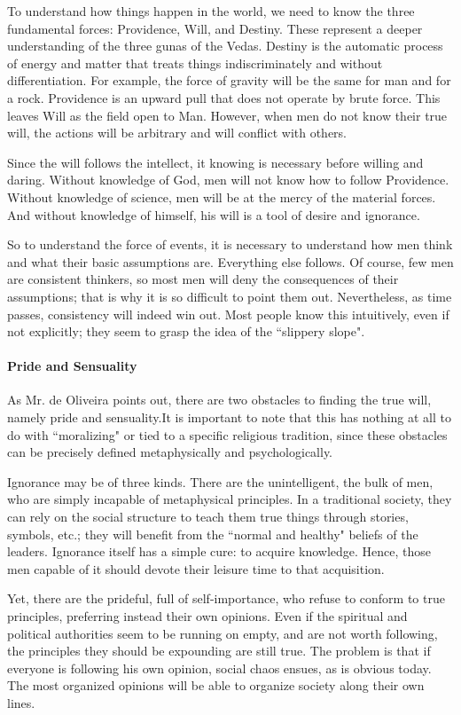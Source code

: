 To understand how things happen in the world, we need to know the three fundamental forces: Providence, Will, and
Destiny. These represent a deeper understanding of the three gunas of the Vedas. Destiny is the automatic process of
energy and matter that treats things indiscriminately and without differentiation. For example, the force of gravity
will be the same for man and for a rock. Providence is an upward pull that does not operate by brute force. This leaves
Will as the field open to Man. However, when men do not know their true will, the actions will be arbitrary and will
conflict with others.

Since the will follows the intellect, it knowing is necessary before willing and daring. Without knowledge of God, men
will not know how to follow Providence. Without knowledge of science, men will be at the mercy of the material forces.
And without knowledge of himself, his will is a tool of desire and ignorance.

So to understand the force of events, it is necessary to understand how men think and what their basic assumptions are.
Everything else follows. Of course, few men are consistent thinkers, so most men will deny the consequences of their
assumptions; that is why it is so difficult to point them out. Nevertheless, as time passes, consistency will indeed
win out. Most people know this intuitively, even if not explicitly; they seem to grasp the idea of the ``slippery
slope".

\paragraph{Pride and Sensuality}
As Mr. de Oliveira points out, there are two obstacles to finding the true will, namely pride and sensuality.It is
important to note that this has nothing at all to do with ``moralizing" or tied to a specific religious tradition, since
these obstacles can be precisely defined metaphysically and psychologically.

Ignorance may be of three kinds. There are the unintelligent, the bulk of men, who are simply incapable of metaphysical
principles. In a traditional society, they can rely on the social structure to teach them true things through stories,
symbols, etc.; they will benefit from the ``normal and healthy" beliefs of the leaders. Ignorance itself has a simple
cure: to acquire knowledge. Hence, those men capable of it should devote their leisure time to that acquisition.

Yet, there are the prideful, full of self-importance, who refuse to conform to true principles, preferring instead their
own opinions. Even if the spiritual and political authorities seem to be running on empty, and are not worth following,
the principles they should be expounding are still true. The problem is that if everyone is following his own opinion,
social chaos ensues, as is obvious today. The most organized opinions will be able to organize society along their own
lines.

